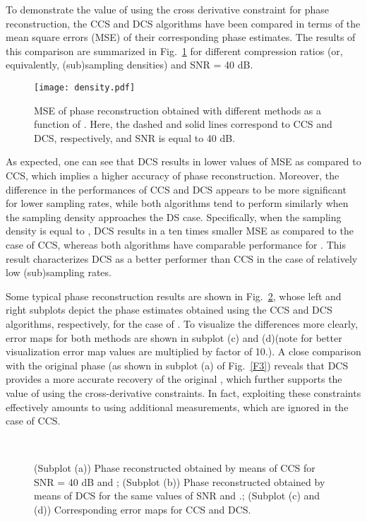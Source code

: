 \pdfoutput=1 \documentclass[journal]{IEEEtran}
\begin{document}
To demonstrate the value of using the cross derivative constraint for phase reconstruction, the CCS and DCS algorithms have been compared in terms of the mean square errors (MSE) of their corresponding phase estimates. The results of this comparison are summarized in Fig.~\ref{F4} for different compression ratios (or, equivalently, (sub)sampling densities) and SNR = 40 dB.

\begin{figure}[!t]
\centering
\texttt{[image: density.pdf]}
\label{fig1:tabsubfig2}
\caption{MSE of phase reconstruction obtained with different methods as a function of . Here, the dashed and solid lines correspond to CCS and DCS, respectively, and SNR is equal to 40 dB.}
\label{F4}
\end{figure}

As expected, one can see that DCS results in lower values of MSE as compared to CCS, which implies a higher accuracy of phase reconstruction. Moreover, the difference in the performances of  CCS and DCS appears to be more significant for lower sampling rates, while both algorithms tend to perform similarly when the sampling density approaches the DS case. Specifically, when the sampling density is equal to , DCS results in a ten times smaller MSE as compared to the case of CCS, whereas both algorithms have comparable performance for . This result characterizes DCS as a better performer than CCS in the case of relatively low (sub)sampling rates.

Some typical phase reconstruction results are shown in Fig.~\ref{F5}, whose left and right subplots depict the phase estimates obtained using the CCS and DCS algorithms, respectively, for the case of . To visualize the differences more clearly, error maps for both methods are shown in subplot (c) and (d)(note for better visualization error map values are multiplied by factor of 10.). A close comparison with the original phase (as shown in subplot (a) of Fig.~\ref{F3}) reveals that DCS provides a more accurate recovery of the original , which further supports the value of using the cross-derivative constraints. In fact, exploiting these constraints effectively amounts to using additional measurements, which are ignored in the case of CCS.

\begin{figure}[!t]
\\
\caption{(Subplot (a)) Phase reconstructed obtained by means of CCS for SNR = 40 dB and ; (Subplot (b)) Phase reconstructed obtained by means of DCS for the same values of SNR and .; (Subplot (c) and (d)) Corresponding error maps for CCS and DCS.}
\label{F5}
\end{figure}
\end{document}
